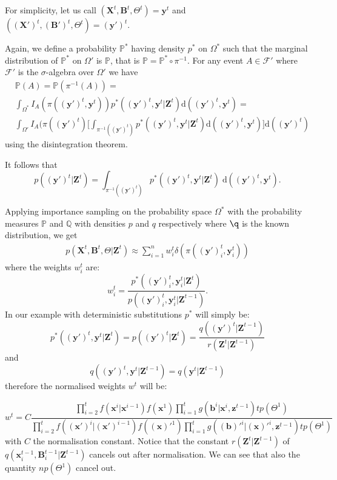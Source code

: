 \documentclass[11pt,a4paper]{article}
\renewcommand{\P}{\mathbb{P}}
\newcommand{\Q}{\mathbb{Q}}
\newcommand{\F}{\mathcal{F}}
\renewcommand{\vec}[1]{\mathbf{#1}}
\newcommand{\D}{\mathrm{d}}
\begin{document}
For simplicity, let us call $(\vec{X}^{t}, \vec{B}^{t}, \Theta^t) = \vec{y}^{t}$ and $(\vec{(X')}^{t}, \vec{(B')}^{t}, \Theta^t) = \vec{(y')}^{t}$.

Again, we define a probability $\P^*$ having density $p^*$ on $\Omega^*$ such that the marginal distribution of $\P^*$ on $\Omega'$ is $\P$, that is $\P = \P^* \circ \pi^{-1}$.
For any event $A \in \F'$ where $\F'$ is the $\sigma$-algebra over $\Omega'$ we have
\begin{align*}
    &\P(A) = \P(\pi^{-1}(A)) = \\
    &\int_{\Omega^*} I_A(\pi(\vec{(y')}^t, \vec{y}^t)) p^*(\vec{(y')}^t, \vec{y}^t | \vec{Z}^t) \D (\vec{(y')}^t, \vec{y}^t) = \\
    & \int_{\Omega'} I_A(\pi(\vec{(y')}^t) \Bigg[ \int_{\pi^{-1}(\vec{(y')}^t)} p^*(\vec{(y')}^t, \vec{y}^t | \vec{Z}^t) \D (\vec{(y')}^t, \vec{y}^t) \Bigg] \D (\vec{(y')}^t)
\end{align*}
using the disintegration theorem.

It follows that
\[
p(\vec{(y')}^t | \vec{Z}^t) = \int_{\pi^{-1}(\vec{(y')}^t)} p^*(\vec{(y')}^t, \vec{y}^t | \vec{Z}^t)\; \D (\vec{(y')}^t, \vec{y}^t).
\]

Applying importance sampling on the probability space $\Omega^*$ with the probability measures $\P$ and $\Q$ with densities $p$ and $q$ respectively where $\q$ is the known distribution, we get
\begin{align*}
p(\vec{X}^{t}, \vec{B}^{t}, \Theta| \vec{Z}^{t}) \approx \sum_{i=1}^n  w^{t}_i \delta(\pi (\vec{(y')}^{t}_i, \vec{y}^{t}_i))
\end{align*}
where the weights $w^{t}_i$ are:
\[
w^{t}_i = \frac{p^*(\vec{(y')}^{t}_i, \vec{y}^{t}_i | \vec{Z}^{t})} {p(\vec{(y')}^{t}_i, \vec{y}^{t}_i|\vec{Z}^{t-1})}.
\]
In our example with deterministic substitutions $p^*$ will simply be:
\[
p^*(\vec{(y')}^{t}, \vec{y}^{t} | \vec{Z}^{t}) = p(\vec{(y')}^{t} | \vec{Z}^{t}) = \frac{ q(\vec{(y')}^{t}|\vec{Z}^{t-1})} {r(\vec{Z}^{t} | \vec{Z}^{t-1})}
\]
and\[
q(\vec{(y')}^{t}, \vec{y}^{t} | \vec{Z}^{t-1}) = q(\vec{y}^{t} | \vec{Z}^{t-1})
\]
therefore the normalised weights $w^t$ will be:

\begin{equation*}
w^{t} = C \frac{\prod_{i=2}^t f(\vec{x}^i | \vec{x}^{i-1}) f(\vec{x}^1) \prod_{i=1}^t g(\vec{b}^i | \vec{x}^i, \vec{z}^{t-1}) t p(\Theta^1)}{\prod_{i=2}^t f(\vec{(x')}^i | \vec{(x')}^{i-1}) f(\vec{(x)'}^1) \prod_{i=1}^t g(\vec{(b)'}^i | \vec{(x)'}^i, \vec{z}^{t-1}) t p(\Theta^1)}
\end{equation*}
with $C$ the normalisation constant. Notice that the constant $r(\vec{Z}^t | \vec{Z}^{t-1})$ of $q(\vec{x}^{t-1}_i,\vec{B}^{t-1}_i | \vec{Z}^{t-1})$ cancels out after normalisation. 
We can see that also the quantity $n p(\Theta^1)$ cancel out.
\end{document}
